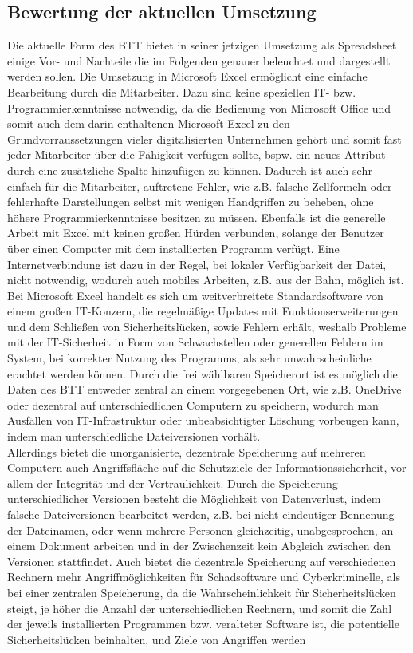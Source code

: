 \subsection{Bewertung der aktuellen Umsetzung}
Die aktuelle Form des BTT bietet in seiner jetzigen Umsetzung als Spreadsheet einige Vor- und Nachteile die im Folgenden genauer beleuchtet und dargestellt werden sollen. Die Umsetzung in Microsoft Excel ermöglicht eine einfache Bearbeitung durch die Mitarbeiter. Dazu sind keine speziellen IT- bzw. Programmierkenntnisse notwendig, da die Bedienung von Microsoft Office und somit auch dem darin enthaltenen Microsoft Excel zu den Grundvorraussetzungen vieler digitalisierten Unternehmen gehört und somit fast jeder Mitarbeiter über die Fähigkeit verfügen sollte, bspw. ein neues Attribut durch eine zusätzliche Spalte hinzufügen zu können. Dadurch ist auch sehr einfach für die Mitarbeiter, auftretene Fehler, wie z.B. falsche Zellformeln oder fehlerhafte Darstellungen selbst mit wenigen Handgriffen zu beheben, ohne höhere Programmierkenntnisse besitzen zu müssen. Ebenfalls ist die generelle Arbeit mit Excel mit keinen großen Hürden verbunden, solange der Benutzer über einen Computer mit dem installierten Programm verfügt. Eine Internetverbindung ist dazu in der Regel, bei lokaler Verfügbarkeit der Datei, nicht notwendig, wodurch auch mobiles Arbeiten, z.B. aus der Bahn, möglich ist.\\Bei Microsoft Excel handelt es sich um weitverbreitete Standardsoftware von einem großen IT-Konzern, die regelmäßige Updates mit Funktionserweiterungen und dem Schließen von Sicherheitslücken, sowie Fehlern erhält, weshalb Probleme mit der IT-Sicherheit in Form von Schwachstellen oder generellen Fehlern im System, bei korrekter Nutzung des Programms, als sehr unwahrscheinliche erachtet werden können. Durch die frei wählbaren Speicherort ist es möglich die Daten des BTT entweder zentral an einem vorgegebenen Ort, wie z.B. OneDrive oder dezentral auf unterschiedlichen Computern zu speichern, wodurch man Ausfällen von IT-Infrastruktur oder unbeabsichtigter Löschung vorbeugen kann, indem man unterschiedliche Dateiversionen vorhält.\\Allerdings bietet die unorganisierte, dezentrale Speicherung auf mehreren Computern auch Angriffsfläche auf die Schutzziele der Informationssicherheit, vor allem der Integrität und der Vertraulichkeit. Durch die Speicherung unterschiedlicher Versionen besteht die Möglichkeit von Datenverlust, indem falsche Dateiversionen bearbeitet werden, z.B. bei nicht eindeutiger Bennenung der Dateinamen, oder wenn mehrere Personen gleichzeitig, unabgesprochen, an einem Dokument arbeiten und in der Zwischenzeit kein Abgleich zwischen den Versionen stattfindet. Auch bietet die dezentrale Speicherung auf verschiedenen Rechnern mehr Angriffmöglichkeiten für Schadsoftware und Cyberkriminelle, als bei einer zentralen Speicherung, da die Wahrscheinlichkeit für Sicherheitslücken steigt, je höher die Anzahl der unterschiedlichen Rechnern, und somit die Zahl der jeweils installierten Programmen bzw. veralteter Software ist, die potentielle Sicherheitslücken beinhalten, und Ziele von Angriffen werden 